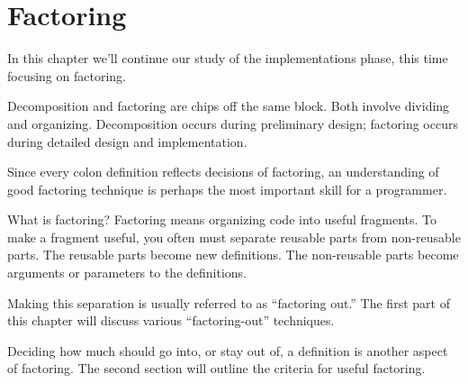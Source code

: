
\chapter{Factoring}

\initial In this chapter we'll continue our study of the implementations phase,
this time focusing on factoring.

Decomposition and factoring are chips off the same block. Both involve
dividing and organizing. Decomposition occurs during preliminary
design; factoring occurs during detailed design and implementation.

Since every colon definition reflects decisions of factoring, an
understanding of good factoring technique is perhaps the most
important skill for a \Forth{} programmer.

What is factoring? Factoring means organizing code into useful
fragments. To make a fragment useful, you often must separate reusable
parts from non-reusable parts. The reusable parts become new
definitions. The non-reusable parts become arguments or parameters to the
definitions.

Making this separation is usually referred to as ``factoring out.''
The first part of this chapter will discuss various ``factoring-out''
techniques.

Deciding how much should go into, or stay out of, a definition is
another aspect of factoring. The second section will outline the
criteria for useful factoring.

